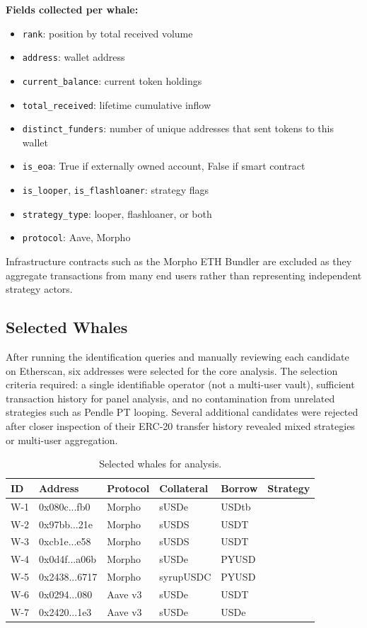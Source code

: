\textbf{Fields collected per whale:}
\begin{itemize}
    \item \texttt{rank}: position by total received volume
    \item \texttt{address}: wallet address
    \item \texttt{current\_balance}: current token holdings
    \item \texttt{total\_received}: lifetime cumulative inflow
    \item \texttt{distinct\_funders}: number of unique addresses that sent tokens to this wallet
    \item \texttt{is\_eoa}: True if externally owned account, False if smart contract
    \item \texttt{is\_looper}, \texttt{is\_flashloaner}: strategy flags
    \item \texttt{strategy\_type}: looper, flashloaner, or both
    \item \texttt{protocol}: Aave, Morpho
\end{itemize}

Infrastructure contracts such as the Morpho ETH Bundler are excluded as they aggregate transactions from many end users rather than representing independent strategy actors.


\subsection{Selected Whales}
After running the identification queries and manually reviewing each candidate on Etherscan, six addresses were selected for the core analysis. The selection criteria required: a single identifiable operator (not a multi-user vault), sufficient transaction history for panel analysis, and no contamination from unrelated strategies such as Pendle PT looping. Several additional candidates were rejected after closer inspection of their ERC-20 transfer history revealed mixed strategies or multi-user aggregation.

\begin{table}[h!]
\centering
\caption{Selected whales for analysis.}
\label{tab:whales}
\begin{tabular}{llllll}
\hline
\textbf{ID} & \textbf{Address} & \textbf{Protocol} & \textbf{Collateral} & \textbf{Borrow} & \textbf{Strategy} \\
\hline
W-1 & 0x080c...fb0 & Morpho & sUSDe & USDtb \\
W-2 & 0x97bb...21e & Morpho & sUSDS & USDT \\
W-3 & 0xcb1e...e58 & Morpho & sUSDS & USDT \\
W-4 & 0x0d4f...a06b & Morpho & sUSDe & PYUSD \\
W-5 & 0x2438...6717 & Morpho & syrupUSDC & PYUSD \\
W-6 & 0x0294...080 & Aave v3 & sUSDe & USDT \\
W-7 & 0x2420...1e3 & Aave v3 & sUSDe & USDe \\
\hline
\end{tabular}
\end{table}


